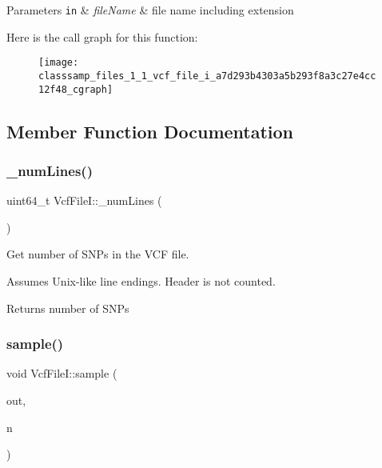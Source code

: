 \begin{DoxyParams}[1]{Parameters}
\mbox{\tt in}  & {\em file\+Name} & file name including extension \\
\hline
\end{DoxyParams}
Here is the call graph for this function\+:\nopagebreak
\begin{figure}[H]
\begin{center}
\leavevmode
\texttt{[image: classsamp\_files\_1\_1\_vcf\_file\_i\_a7d293b4303a5b293f8a3c27e4cc12f48\_cgraph]}
\end{center}
\end{figure}


\subsection{Member Function Documentation}
\mbox{\label{classsamp_files_1_1_vcf_file_i_a02f2494cc78e8d83733a2bb0c9a84602}} 
\subsubsection{\texorpdfstring{\+\_\+num\+Lines()}{\_numLines()}}
{\footnotesize\ttfamily uint64\+\_\+t Vcf\+File\+I\+::\+\_\+num\+Lines (\begin{DoxyParamCaption}{ }\end{DoxyParamCaption})\hspace{0.3cm}{\ttfamily [protected]}}



Get number of S\+N\+Ps in the V\+CF file. 

Assumes Unix-\/like line endings. Header is not counted.

\begin{DoxyReturn}{Returns}
number of S\+N\+Ps 
\end{DoxyReturn}
\mbox{\label{classsamp_files_1_1_vcf_file_i_a1f8fcdba2d343654b3c9492a3dd80e93}} 
\subsubsection{\texorpdfstring{sample()}{sample()}}
{\footnotesize\ttfamily void Vcf\+File\+I\+::sample (\begin{DoxyParamCaption}\item[{\hyperlink{classsamp_files_1_1_vcf_file_o}{Vcf\+FileO} \&}]{out,  }\item[{const uint64\+\_\+t \&}]{n }\end{DoxyParamCaption})}



